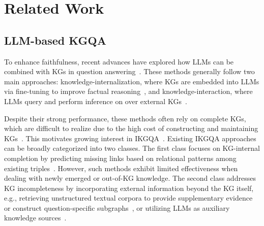 


\section{Related Work}

\subsection{LLM-based KGQA}
To enhance faithfulness, recent advances have explored how LLMs can be combined with KGs in question answering~\cite{liu2020reasoning, huang2024joint}. These methods generally follow two main approaches: knowledge-internalization, where KGs are embedded into LLMs via fine-tuning to improve factual reasoning~\cite{li2023trea}, and knowledge-interaction, where LLMs query and perform inference on over external KGs~\cite{sun2023think}. 


Despite their strong performance, these methods often rely on complete KGs, which are difficult to realize due to the high cost of constructing and maintaining KGs~\cite{hur2021survey}. This motivates growing interest in IKGQA~\cite{min2013distant, pflueger2022gnnq}. Existing IKGQA approaches can be broadly categorized into two classes. The first class focuses on KG-internal completion by predicting missing links based on relational patterns among existing triples~\cite{saxena2022sequence, zan2022complex, guo2023knowledge}. However, such methods exhibit limited effectiveness when dealing with newly emerged or out-of-KG knowledge. The second class addresses KG incompleteness by incorporating external information beyond the KG itself, e.g., retrieving unstructured textual corpora to provide supplementary evidence or construct question-specific subgraphs~\cite{sun2019pullnet, lv2020graph}, or utilizing LLMs as auxiliary knowledge sources~\cite{xu2024generate}.


